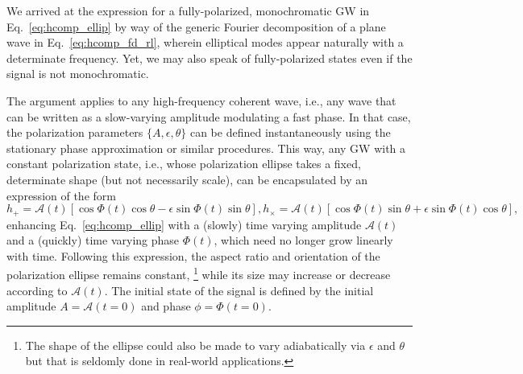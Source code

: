 \documentclass[aps,prd,twocolumn,superscriptaddress,preprintnumbers,floatfix,nofootinbib]{revtex4-2}
\begin{document}

We arrived at the expression for a fully-polarized, monochromatic GW in Eq.~\eqref{eq:hcomp_ellip} by way of the generic Fourier decomposition of a plane wave in Eq.~\eqref{eq:hcomp_fd_rl}, wherein elliptical modes appear naturally with a determinate frequency.
Yet, we may also speak of fully-polarized states even if the signal is not monochromatic.

The argument applies to any high-frequency coherent wave, i.e., any wave that can be written as a slow-varying amplitude modulating a fast phase.
In that case, the polarization parameters $\{A, \epsilon, \theta\}$ can be defined instantaneously using the stationary phase approximation or similar procedures.
This way, any GW with a constant polarization state, i.e., whose polarization ellipse takes a fixed, determinate shape (but not necessarily scale), can be encapsulated by an expression of the form
\begin{subequations} \label{eq:ellip_gen}
\begin{equation} %
h_+ = \mathcal{A}(t) \left[\cos \Phi(t) \cos \theta - \epsilon \sin \Phi(t) \sin\theta \right] ,
\end{equation}
\begin{equation} %
h_\times = \mathcal{A}(t) \left[ \cos \Phi(t) \sin \theta + \epsilon \sin \Phi(t) \cos\theta \right] ,
\end{equation}
\end{subequations}
enhancing Eq.~\eqref{eq:hcomp_ellip} with a (slowly) time varying amplitude $\mathcal{A}(t)$ and a (quickly) time varying phase $\Phi(t)$, which need no longer grow linearly with time.
Following this expression, the aspect ratio and orientation of the polarization ellipse remains constant,%
\footnote{The shape of the ellipse could also be made to vary adiabatically via $\epsilon$ and $\theta$ but that is seldomly done in real-world applications.}
while its size may increase or decrease according to $\mathcal{A}(t)$.
The initial state of the signal is defined by the initial amplitude $A = \mathcal{A}(t=0)$ and phase $\phi = \Phi(t=0)$.
\end{document}
